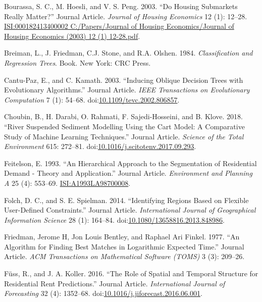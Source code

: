 \documentclass[]{elsarticle} %
\begin{document}
\hypertarget{ref-Bourassa2003}{}
Bourassa, S. C., M. Hoesli, and V. S. Peng. 2003. ``Do Housing
Submarkets Really Matter?'' Journal Article. \emph{Journal of Housing
Economics} 12 (1): 12--28.
\href{ISI:000182413400002\%0AC:/Papers/Journal\%20of\%20Housing\%20Economics/Journal\%20of\%20Housing\%20Economics\%20(2003)\%2012\%20(1)\%2012-28.pdf}{ISI:000182413400002
C:/Papers/Journal of Housing Economics/Journal of Housing Economics (2003) 12 (1) 12-28.pdf}.

\hypertarget{ref-Breiman1984}{}
Breiman, L., J. Friedman, C.J. Stone, and R.A. Olshen. 1984.
\emph{Classification and Regression Trees}. Book. New York: CRC Press.

\hypertarget{ref-Cantu-Paz2003}{}
Cantu-Paz, E., and C. Kamath. 2003. ``Inducing Oblique Decision Trees
with Evolutionary Algorithms.'' Journal Article. \emph{IEEE Transactions
on Evolutionary Computation} 7 (1): 54--68.
doi:\href{https://doi.org/10.1109/tevc.2002.806857}{10.1109/tevc.2002.806857}.

\hypertarget{ref-Choubin2018}{}
Choubin, B., H. Darabi, O. Rahmati, F. Sajedi-Hosseini, and B. Klove.
2018. ``River Suspended Sediment Modelling Using the Cart Model: A
Comparative Study of Machine Learning Techniques.'' Journal Article.
\emph{Science of the Total Environment} 615: 272--81.
doi:\href{https://doi.org/10.1016/j.scitotenv.2017.09.293}{10.1016/j.scitotenv.2017.09.293}.

\hypertarget{ref-Feitelson1993}{}
Feitelson, E. 1993. ``An Hierarchical Approach to the Segmentation of
Residential Demand - Theory and Application.'' Journal Article.
\emph{Environment and Planning A} 25 (4): 553--69.
\url{ISI:A1993LA98700008}.

\hypertarget{ref-Folch2014}{}
Folch, D. C., and S. E. Spielman. 2014. ``Identifying Regions Based on
Flexible User-Defined Constraints.'' Journal Article.
\emph{International Journal of Geographical Information Science} 28 (1):
164--84.
doi:\href{https://doi.org/10.1080/13658816.2013.848986}{10.1080/13658816.2013.848986}.

\hypertarget{ref-Friedman1977}{}
Friedman, Jerome H, Jon Louis Bentley, and Raphael Ari Finkel. 1977.
``An Algorithm for Finding Best Matches in Logarithmic Expected Time.''
Journal Article. \emph{ACM Transactions on Mathematical Software (TOMS)}
3 (3): 209--26.

\hypertarget{ref-Fuss2016}{}
Füss, R., and J. A. Koller. 2016. ``The Role of Spatial and Temporal
Structure for Residential Rent Predictions.'' Journal Article.
\emph{International Journal of Forecasting} 32 (4): 1352--68.
doi:\href{https://doi.org/10.1016/j.jiforecast.2016.06.001}{10.1016/j.jiforecast.2016.06.001}.
\end{document}
